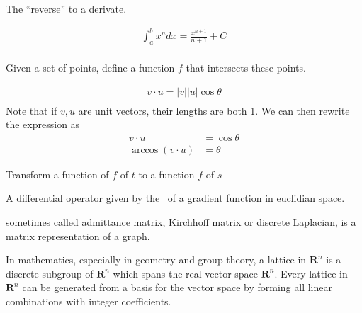 \begin{definition}[Integral]
    The ``reverse'' to a derivate. 

    \begin{align}
        \int_{a}^{b}x^{n} dx = \frac{x^{n+1}}{n+1} + C \\
    \end{align}

\end{definition}

\begin{definition}
    Given a set of points, define a function $f$ that intersects these points.
\end{definition}

\begin{definition}
    \begin{align*}
        v \cdot u = |v||u|\cos{\theta} \\
    \end{align*}
    Note that if $v, u$ are unit vectors, their lengths are both 1.
    We can then rewrite the expression as
    \begin{align*}
        v \cdot u &= \cos{\theta} \\
        \arccos{(v \cdot u)} &= \theta
    \end{align*}
\end{definition}

\begin{definition}
    Transform a function of $f$ of $t$ to a function $f$ of $s$

    A differential operator given by the~ of a gradient 
    function in euclidian space.
\end{definition}

\begin{definition}
    sometimes called admittance matrix, Kirchhoff matrix or discrete Laplacian,
    is a matrix representation of a graph.

\end{definition}

\begin{definition}[Lattice]
    In mathematics, especially in geometry and group theory, a lattice in
    $\mathbf{R}^n$ is a discrete subgroup of $\mathbf{R}^n$ which spans the real
    vector space $\mathbf{R}^n$. Every lattice in $\mathbf{R}^n$ can be generated
    from a basis for the vector space by forming all linear combinations with
    integer coefficients. 

\end{definition}

